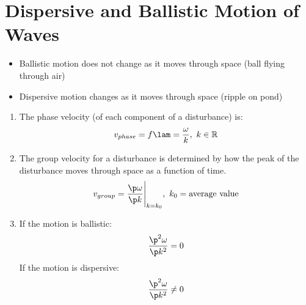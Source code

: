 \documentclass[a4paper, 11pt, normalem]{report}
\begin{document}
\section{Dispersive and Ballistic Motion of Waves}
\begin{itemize}
    \item Ballistic motion does not change as it moves through space (ball flying through air)
    \item Dispersive motion changes as it moves through space (ripple on pond)
\end{itemize}
\begin{enumerate}
    \item The phase velocity (of each component of a disturbance) is:
    \begin{equation}
        v_{phase} = f\lam = \frac{\omega}{k},~ k \in \mathbb{R}
    \end{equation}
    \item The group velocity for a disturbance is determined by how the peak of the disturbance moves through space as a function of time.
    \begin{equation}
        v_{group} = \frac{\p\omega}{\p k}\Bigg|_{k = k_0}, ~ k_0 = \text{average value}
    \end{equation}
    \item If the motion is ballistic:
    \begin{equation}
        \frac{\p^2\omega}{\p k^2} = 0
    \end{equation}
    If the motion is dispersive:
    \begin{equation}
        \frac{\p^2 \omega}{\p k^2} \neq 0
    \end{equation}
\end{enumerate}
\end{document}
